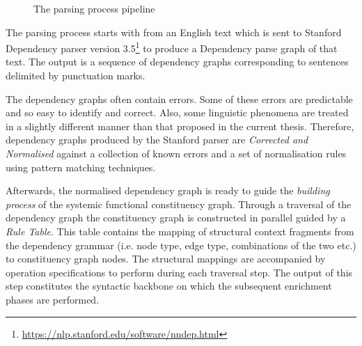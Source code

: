 \begin{figure}[!ht]
    \caption[]{The parsing process pipeline}
    \label{fig:pipeline-overview}
\end{figure}


The parsing process starts with from an English text which is sent to Stanford Dependency parser \citep{chen2014fast} version 3.5\footnote{\url{https://nlp.stanford.edu/software/nndep.html}} to produce a Dependency parse graph of that text. The output is a sequence of dependency graphs corresponding to sentences delimited by punctuation marks.

The dependency graphs often contain errors. Some of these errors are predictable and so easy to identify and correct. Also, some linguistic phenomena are treated in a slightly different manner than that proposed in the current thesis. Therefore, dependency graphs produced by the Stanford parser are \textit{Corrected and Normalised} against a collection of known errors and a set of normalisation rules using pattern matching techniques.

Afterwards, the normalised dependency graph is ready to guide the \textit{building process} of the systemic functional constituency graph. Through a traversal of the dependency graph the constituency graph is constructed in parallel guided by a \textit{Rule Table}. This table contains the mapping of structural context fragments from the dependency grammar (i.e. node type, edge type, combinations of the two etc.) to constituency graph nodes. The structural mappings are accompanied by operation specifications to perform during each traversal step. The output of this step constitutes the syntactic backbone on which the subsequent enrichment phases are performed.

